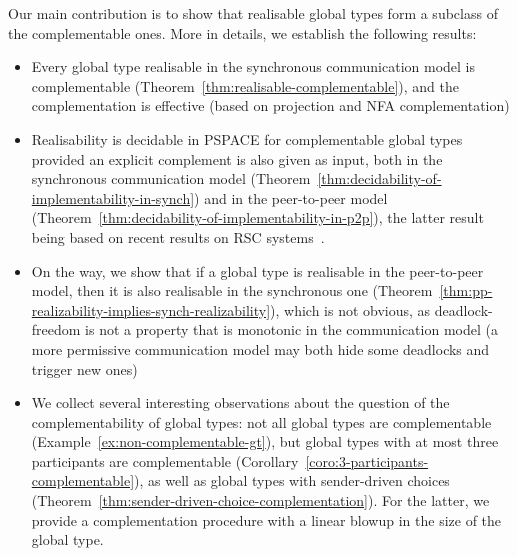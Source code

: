 Our main contribution is to show that realisable global types form a subclass of the complementable ones.
More in details, we establish the following results:

\begin{itemize}
\item Every global type realisable in the synchronous communication model is complementable (Theorem~\ref{thm:realisable-complementable}), and the complementation is
effective (based on projection and NFA complementation)
\item Realisability is decidable in PSPACE for complementable global types provided an explicit complement is also given as input,
both in the synchronous communication model (Theorem~\ref{thm:decidability-of-implementability-in-synch}) and in the peer-to-peer model 
(Theorem~\ref{thm:decidability-of-implementability-in-p2p}), the latter result being based on recent results on RSC systems~\cite{germerie-phd}.
\item On the way, we show that if a global type is realisable in the peer-to-peer model, then it is also realisable in the synchronous one (Theorem~\ref{thm:pp-realizability-implies-synch-realizability}), which is not obvious, as 
deadlock-freedom is not a property that is monotonic in the communication model (a more permissive communication model may both hide some deadlocks and trigger new ones)
\item We collect several interesting observations about the question of the complementability of global types: not all global types are complementable (Example~\ref{ex:non-complementable-gt}),
but global types with at most three participants are complementable (Corollary~\ref{coro:3-participants-complementable}), 
as well as global types with sender-driven choices (Theorem~\ref{thm:sender-driven-choice-complementation}). For the latter, we provide
a complementation procedure with a linear blowup in the size of the global type.
\end{itemize}


